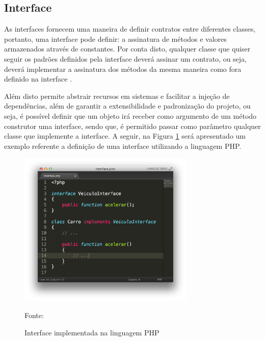 \subsection{Interface}

As interfaces fornecem uma maneira de definir contratos entre diferentes
classes, portanto, uma interface pode definir: a assinatura de métodos e
valores armazenados através de constantes. Por conta disto, qualquer classe  que
quiser seguir os padrões definidos pela interface deverá assinar um contrato,
ou seja, deverá implementar a assinatura dos métodos da mesma maneira como  fora
definido na interface \cite{programmingPhp}.

Além disto permite abstrair recursos em sistemas e facilitar a
injeção de dependências, além de garantir a extensibilidade e padronização do
projeto, ou seja, é possível definir que um objeto irá receber como argumento de
um método construtor uma interface, sendo que, é permitido passar como parâmetro
qualquer classe que implemente a interface. A seguir, na Figura
\ref{fig:interface} será apresentado um exemplo referente a definição de uma 
interface utilizando a linguagem \acs{PHP}.

\begin{figure}[h!tb]
	\caption{Interface implementada na linguagem PHP}
	\label{fig:interface}

	\centering
	\includegraphics[width=0.75\textwidth]{images/interface.png}

	\centering
	\footnotesize Fonte: \fonteOAutor
\end{figure}

\FloatBarrier 	%

